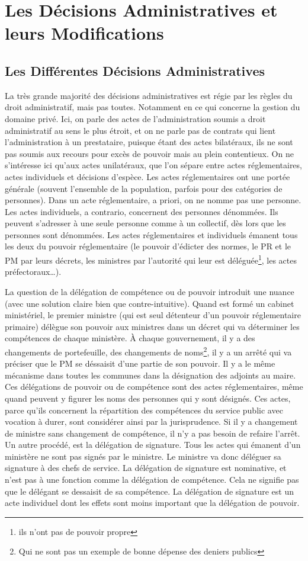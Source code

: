 \documentclass[math]{cours}
\begin{document}
\section{Les Décisions Administratives et leurs Modifications}
\subsection{Les Différentes Décisions Administratives}
La très grande majorité des décisions administratives est régie par les règles du droit administratif, mais pas toutes. Notamment en ce qui concerne la gestion du domaine privé.
Ici, on parle des actes de l'administration soumis a droit administratif au sens le plus étroit, et on ne parle pas de contrats qui lient l'administration à un prestataire, puisque étant des actes bilatéraux, ils ne sont pas soumis aux recours pour excès de pouvoir mais au plein contentieux.
On ne s'intéresse ici qu'aux actes unilatéraux, que l'on sépare entre actes réglementaires, actes individuels et décisions d'espèce.
Les actes réglementaires ont une portée générale (souvent l'ensemble de la population, parfois pour des catégories de personnes).
Dans un acte réglementaire, a priori, on ne nomme pas une personne.
Les actes individuels, a contrario, concernent des personnes dénommées.
Ils peuvent s'adresser à une seule personne comme à un collectif, dès lors que les personnes sont dénommées.
Les actes réglementaires et individuels émanent tous les deux du pouvoir réglementaire (le pouvoir d'édicter des normes, le PR et le PM par leurs décrets, les ministres par l'autorité qui leur est déléguée\footnote{ils n'ont pas de pouvoir propre}, les actes préfectoraux\ldots).

La question de la délégation de compétence ou de pouvoir introduit une nuance (avec une solution claire bien que contre-intuitive).
Quand est formé un cabinet ministériel, le premier ministre (qui est seul détenteur d'un pouvoir réglementaire primaire) délègue son pouvoir aux ministres dans un décret qui va déterminer les compétences de chaque ministère.
À chaque gouvernement, il y a des changements de portefeuille, des changements de noms\footnote{Qui ne sont pas un exemple de bonne dépense des deniers publics}, il y a un arrêté qui va préciser que le PM se déssaisit d'une partie de son pouvoir.
Il y a le même mécanisme dans toutes les communes dans la désignation des adjoints au maire.
Ces délégations de pouvoir ou de compétence sont des actes réglementaires, même quand peuvent y figurer les noms des personnes qui y sont désignés.
Ces actes, parce qu'ils concernent la répartition des compétences du service public avec vocation à durer, sont considérer ainsi par la jurisprudence. Si il y a changement de ministre sans changement de compétence, il n'y a pas besoin de refaire l'arrêt.
Un autre procédé, est la délégation de signature. Tous les actes qui émanent d'un ministère ne sont pas signés par le ministre.
Le ministre va donc déléguer sa signature à des chefs de service.
La délégation de signature est nominative, et n'est pas à une fonction comme la délégation de compétence.
Cela ne signifie pas que le délégant se dessaisit de sa compétence.
La délégation de signature est un acte individuel dont les effets sont moins important que la délégation de pouvoir.
\end{document}
